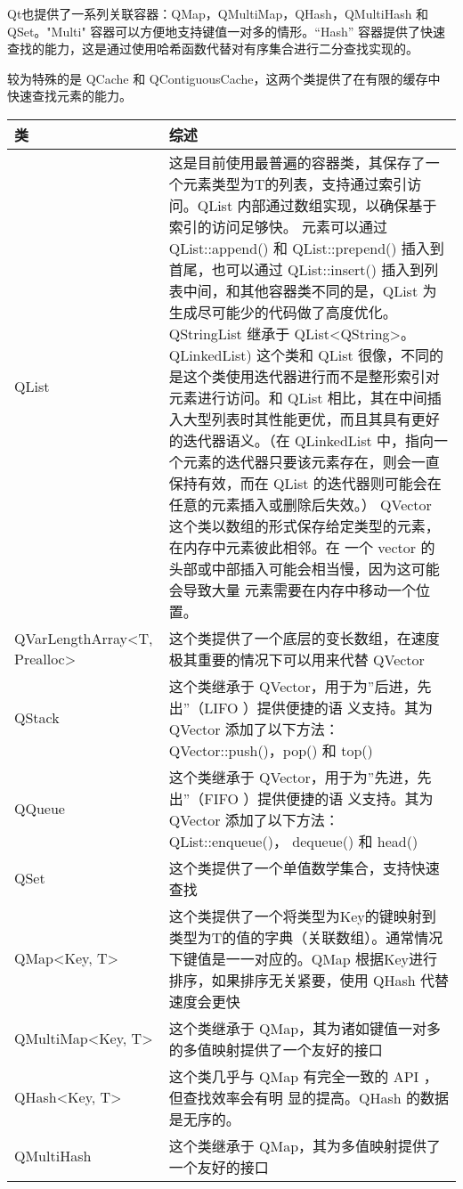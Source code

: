 Qt也提供了一系列关联容器：QMap，QMultiMap，QHash，QMultiHash 和 QSet。"Multi" 容器可以方便地支持键值一对多的情形。“Hash” 容器提供了快速查找的能力，这是通过使用哈希函数代替对有序集合进行二分查找实现的。

较为特殊的是 QCache 和 QContiguousCache，这两个类提供了在有限的缓存中
快速查找元素的能力。


\begin{tabular}{|l|l|}
\hline
类&综述 \\
\hline
QList&	这是目前使用最普遍的容器类，其保存了一个元素类型为T的列表，支持通过索引访问。QList 内部通过数组实现，以确保基于索引的访问足够快。
元素可以通过 QList::append() 和 QList::prepend() 插入到首尾，也可以通过 QList::insert() 插入到列表中间，和其他容器类不同的是，QList 为生成尽可能少的代码做了高度优化。QStringList 继承于 QList<QString>。
QLinkedList)	这个类和 QList 很像，不同的是这个类使用迭代器进行而不是整形索引对元素进行访问。和 QList 相比，其在中间插入大型列表时其性能更优，而且其具有更好的迭代器语义。（在 QLinkedList 中，指向一个元素的迭代器只要该元素存在，则会一直保持有效，而在 QList 的迭代器则可能会在任意的元素插入或删除后失效。）
QVector	这个类以数组的形式保存给定类型的元素，在内存中元素彼此相邻。在
       一个 vector 的头部或中部插入可能会相当慢，因为这可能会导致大量
       元素需要在内存中移动一个位置。\\
\hline
QVarLengthArray<T, Prealloc>&	这个类提供了一个底层的变长数组，在速度极其重要的情况下可以用来代替 QVector\\
QStack&	这个类继承于 QVector，用于为”后进，先出”（LIFO ）提供便捷的语
        义支持。其为 QVector 添加了以下方法：QVector::push()，pop() 和
        top()\\
\hline
QQueue&	这个类继承于 QVector，用于为”先进，先出”（FIFO ）提供便捷的语
        义支持。其为 QVector 添加了以下方法：QList::enqueue()，
        dequeue() 和 head()\\
\hline
QSet&	这个类提供了一个单值数学集合，支持快速查找\\
\hline
QMap<Key, T>&	这个类提供了一个将类型为Key的键映射到类型为T的值的字典（关联数组）。通常情况下键值是一一对应的。QMap 根据Key进行排序，如果排序无关紧要，使用 QHash 代替速度会更快\\
\hline
QMultiMap<Key, T>&	这个类继承于 QMap，其为诸如键值一对多的多值映射提供了一个友好的接口\\
\hline
QHash<Key, T>&	这个类几乎与 QMap 有完全一致的 API ，但查找效率会有明
               显的提高。QHash 的数据是无序的。\\
\hline
QMultiHash&	这个类继承于 QMap，其为多值映射提供了一个友好的接口\\
\hline
\end{tabular}

